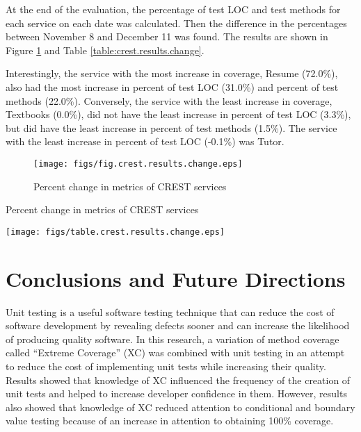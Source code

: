 At the end of the evaluation, the percentage of test LOC and test methods
for each service on each date was calculated.  Then the difference in the
percentages between November 8 and December 11 was found.  The results are
shown in Figure \ref{fig:crest.results.change} and Table
\ref{table:crest.results.change}.

Interestingly, the service with the most increase in coverage, Resume
(72.0\%), also had the most increase in percent of test LOC (31.0\%) and
percent of test methods (22.0\%).  Conversely, the service with the least
increase in coverage, Textbooks (0.0\%), did not have the least increase in
percent of test LOC (3.3\%), but did have the least increase in percent of
test methods (1.5\%).  The service with the least increase in percent of
test LOC (-0.1\%) was Tutor.

\begin{figure}[htbp]
  \begin{center}
    \texttt{[image: figs/fig.crest.results.change.eps]}
    \caption{Percent change in metrics of CREST services}
    \label{fig:crest.results.change}
  \end{center}
\end{figure}

\begin{table}[htbp]
  \begin{center}
    \caption{Percent change in metrics of CREST services}
    \texttt{[image: figs/table.crest.results.change.eps]}
    \label{table:crest.results.change}
    \end{center}
\end{table}

\chapter{Conclusions and Future Directions}

Unit testing is a useful software testing technique that can reduce the
cost of software development by revealing defects sooner and can increase
the likelihood of producing quality software.  In this research, a
variation of method coverage called ``Extreme Coverage'' (XC) was combined
with unit testing in an attempt to reduce the cost of implementing unit
tests while increasing their quality.  Results showed that knowledge of XC
influenced the frequency of the creation of unit tests and helped to
increase developer confidence in them.  However, results also showed that
knowledge of XC reduced attention to conditional and boundary value testing
because of an increase in attention to obtaining 100\% coverage.


